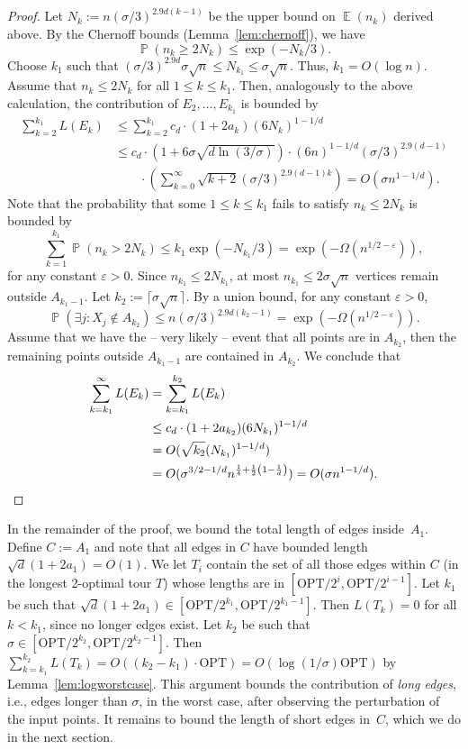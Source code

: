 \documentclass[11pt,DIV=12,a4paper]{scrartcl}
\DeclareMathOperator{\probab}{\mathbb{P}}
\DeclareMathOperator{\expected}{\mathbb{E}}
\newcommand{\OPT}{\mathrm{OPT}}
\begin{document}
\begin{proof}
Let $N_k := n(\sigma/3)^{2.9d(k-1)}$ be the upper bound on $\expected(n_k)$ derived above. By the Chernoff bounds (Lemma~\ref{lem:chernoff}), we have
\[
  \probab(n_k \ge 2N_k) \le \exp(-N_k/3).
\]
Choose $k_1$ such that $(\sigma/3)^{2.9d} \sigma \sqrt{n} \le N_{k_1}\le \sigma\sqrt{n}$. Thus, $k_1 = O(\log n)$.  Assume that $n_k \le 2N_k$ for all $1\le k \le k_1$. Then, analogously to the above calculation, the contribution of $E_2, \dots, E_{k_1}$ is bounded by
\begin{align*}
 \sum_{k=2}^{k_1} L(E_k) & \le  \sum_{k=2}^{k_1} c_d \cdot (1+2a_k) (6N_k)^{1-1/d} \\
& \le  c_d \cdot \left(1+6\sigma \sqrt{d\ln( 3/\sigma)}\right)\cdot  (6n)^{1-1/d} (\sigma/3)^{2.9(d-1)} \\
& \qquad \cdot \left(\sum_{k=0}^\infty \sqrt{k+2} (\sigma / 3)^{2.9(d-1)k}\right)  =  O(\sigma n^{1-1/d}).
\end{align*}
Note that the probability that some $1\le k \le k_1$ fails to satisfy $n_k \le 2N_k$ is bounded by 
\[ \sum_{k=1}^{k_1} \probab(n_k > 2N_k) \le k_1 \exp(-N_{k_1}/3) = \exp(-\Omega(n^{1/2-\varepsilon})),\]
for any constant $\varepsilon > 0$. 
Since $n_{k_1} \le 2 N_{k_1}$, at most $n_{k_1} \le 2\sigma\sqrt{n}$ vertices remain outside $A_{k_1-1}$. Let $k_2 := \lceil \sigma \sqrt{n} \rceil$. By a
union bound, for any constant $\varepsilon >0$,
\[ \probab(\exists j: X_j \notin A_{k_2}) \le n(\sigma/3)^{2.9d(k_2-1)} = \exp(-\Omega(n^{1/2-\varepsilon})). \]
Assume that we have the -- very likely -- event that all points are in $A_{k_2}$, then the remaining points outside $A_{k_1-1}$ are contained in $A_{k_2}$. We conclude that
\begin{align*}
\sum_{k=k_1}^\infty L(E_k) & = \sum_{k=k_1}^{k_2} L(E_k) \\
& \le c_d \cdot (1+2a_{k_2}) (6N_{k_1})^{1-1/d} \\
& = O(\sqrt{k_2}(N_{k_1})^{1-1/d}) \\
& = O(\sigma^{3/2-1/d} n^{\frac{1}{4}+\frac{1}{2}\left(1-\frac{1}{d}\right)}) = O(\sigma n^{1-1/d}). \qedhere
\end{align*}
\end{proof}

In the remainder of the proof, we bound the total length of edges inside~$A_1$. Define $C:=A_1$ and note that all edges in $C$ have bounded length $\sqrt{d}(1+2a_1)=O(1)$. We let $T_i$ contain the set of all those edges within $C$ (in the longest 2-optimal tour $T$) whose lengths are in $[\OPT/2^i,\OPT/2^{i-1}]$. Let $k_1$ be such that $\sqrt{d}(1+2a_1) \in [\OPT/2^{k_1},\OPT/2^{k_1-1}]$. Then $L(T_k)=0$ for all $k <k_1$, since no longer edges exist. Let $k_2$ be such that $\sigma \in [\OPT/2^{k_2},\OPT/2^{k_2-1}]$. Then $\sum_{k=k_1}^{k_2} L(T_k) = O((k_2-k_1)\cdot \OPT) = O(\log(1/\sigma)\OPT)$ by Lemma~\ref{lem:logworstcase}. This argument bounds the contribution of \emph{long edges}, i.e., edges longer than $\sigma$, in the worst case, after observing the perturbation of the input points. It remains to bound the length of short edges in~$C$, which we do in the next section.
\end{document}
